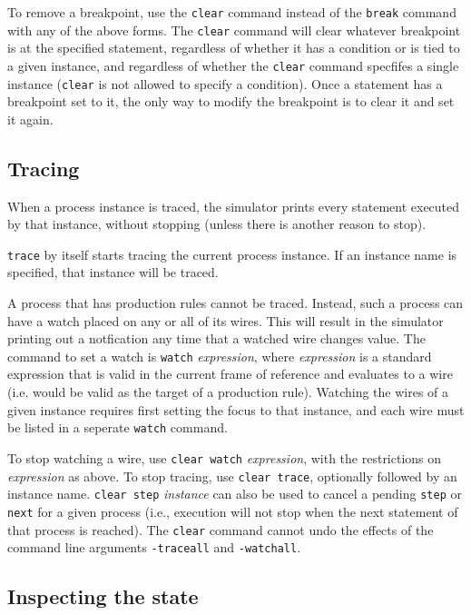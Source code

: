 To remove a breakpoint, use the \verb|clear| command instead of the \verb|break|
command with any of the above forms.  The \verb|clear| command will clear
whatever breakpoint is at the specified statement, regardless of whether it has
a condition or is tied to a given instance, and regardless of whether the
\verb|clear| command specfifes a single instance (\verb|clear| is not allowed
to specify a condition).  Once a statement has a breakpoint set to it, the only
way to modify the breakpoint is to clear it and set it again.

\subsection{Tracing}\label{sec:trace}

When a process instance is traced, the simulator prints every statement
executed by that instance, without stopping (unless there is another
reason to stop).

\verb|trace| by itself starts tracing the current process instance. If an
instance name is specified, that instance will be traced.

A process that has production rules cannot be traced.  Instead, such a process
can have a watch placed on any or all of its wires.  This will result in the
simulator printing out a notfication any time that a watched wire changes value.
The command to set a watch is \verb|watch| {\it expression}, where
{\it expression} is a standard expression that is valid in the current frame
of reference and evaluates to a wire (i.e. would be valid as the target of a
production rule).  Watching the wires of a given instance requires first setting
the focus to that instance, and each wire must be listed in a seperate
\verb|watch| command.

To stop watching a  wire, use \verb|clear watch| {\it expression}, with the
restrictions on {\it expression} as above.
To stop tracing, use \verb|clear trace|, optionally followed by an instance
name. \verb|clear step| {\it instance} can also be used to cancel
a pending \verb|step| or \verb|next| for a given process (i.e., execution will not
stop when the next statement of that process is reached).  The \verb|clear|
command cannot undo the effects of the command line arguments \verb|-traceall|
and \verb|-watchall|.

\subsection{Inspecting the state}\label{sec:inspect}

